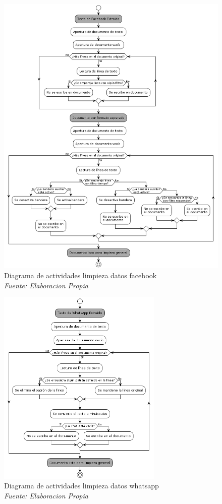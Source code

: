 \begin{figure}[h!]
	\includegraphics[width=1\textwidth]{capitulo5/figuras/prueba.png}
	\caption[Diagrama de actividades limpieza datos facebook]{Diagrama de actividades limpieza datos facebook
		\\\textit{Fuente: Elaboracion Propia}}
	\label{fig:um12}
\end{figure}

\begin{figure}[h!]
	\includegraphics[width=0.7\textwidth]{capitulo5/figuras/part3.png}
	\caption[Diagrama de actividades limpieza datos whatsapp]{Diagrama de actividades limpieza datos whatsapp
		\\\textit{Fuente: Elaboracion Propia}}
	\label{fig:um13}
\end{figure}


\clearpage
